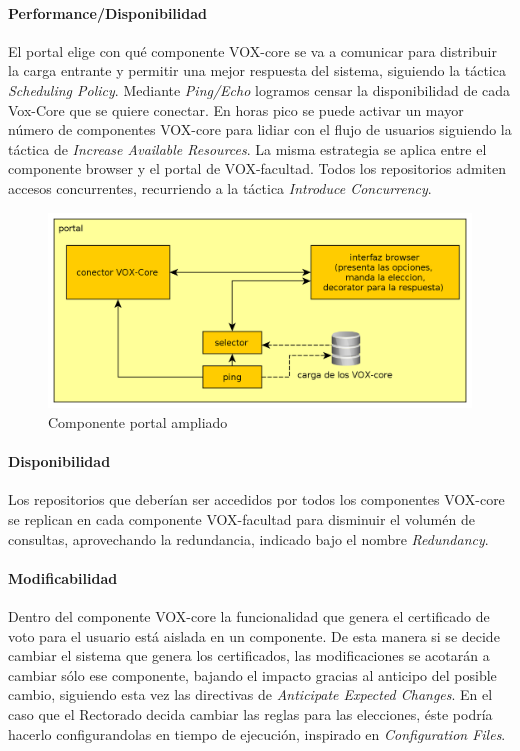 \paragraph{Performance/Disponibilidad}
El portal elige con qué componente VOX-core se va a comunicar para distribuir la carga entrante y permitir una mejor respuesta del sistema, siguiendo la táctica \textit{Scheduling Policy}. Mediante \textit{Ping/Echo} logramos censar la disponibilidad de cada Vox-Core que se quiere conectar. En horas pico se puede activar un mayor número de componentes VOX-core para lidiar con el flujo de usuarios siguiendo la táctica de \textit{Increase Available Resources}. La misma estrategia se aplica entre el componente browser y el portal de VOX-facultad.
Todos los repositorios admiten accesos concurrentes, recurriendo a la táctica \textit{Introduce Concurrency}.
\begin{figure}[H]
	\begin{center}
		\includegraphics[scale=0.22]{../diagramas/portal.png}
		\caption{Componente portal ampliado}
	\end{center} 
\end{figure}

\paragraph{Disponibilidad}
Los repositorios que deberían ser accedidos por todos los componentes VOX-core se replican en cada componente VOX-facultad para disminuir el volumén de consultas, aprovechando la redundancia, indicado bajo el nombre \textit{Redundancy}.

\paragraph{Modificabilidad}
Dentro del componente VOX-core la funcionalidad que genera el certificado de voto para el usuario está aislada en un componente. De esta manera si se decide cambiar el sistema que genera los certificados, las modificaciones se acotarán a cambiar sólo ese componente, bajando el impacto gracias al anticipo del posible cambio, siguiendo esta vez las directivas de \textit{Anticipate Expected Changes}. En el caso que el Rectorado decida cambiar las reglas para las elecciones, éste podría hacerlo configurandolas en tiempo de ejecución, inspirado en \textit{Configuration Files}.


